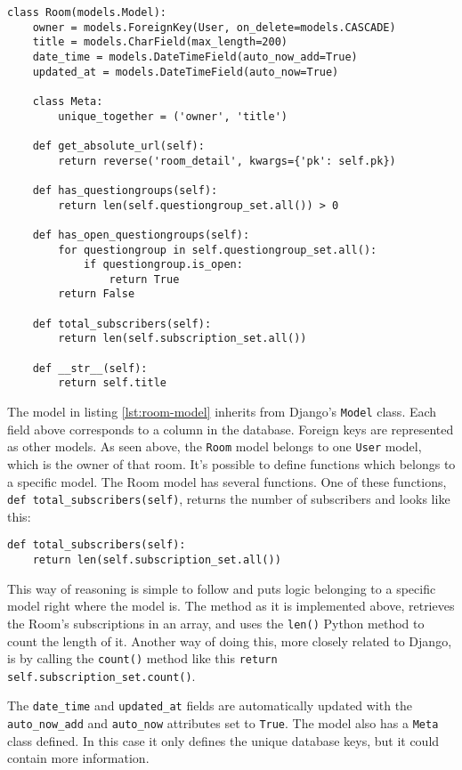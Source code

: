 \begin{lstlisting}[caption=The Room model, label=lst:room-model]
class Room(models.Model):
    owner = models.ForeignKey(User, on_delete=models.CASCADE)
    title = models.CharField(max_length=200)
    date_time = models.DateTimeField(auto_now_add=True)
    updated_at = models.DateTimeField(auto_now=True)

    class Meta:
        unique_together = ('owner', 'title')

    def get_absolute_url(self):
        return reverse('room_detail', kwargs={'pk': self.pk})

    def has_questiongroups(self):
        return len(self.questiongroup_set.all()) > 0

    def has_open_questiongroups(self):
        for questiongroup in self.questiongroup_set.all():
            if questiongroup.is_open:
                return True
        return False

    def total_subscribers(self):
        return len(self.subscription_set.all())

    def __str__(self):
        return self.title
\end{lstlisting}


The model in listing \ref{lst:room-model} inherits from Django's \texttt{Model} class. Each field above corresponds to a column in the database. Foreign keys are represented as other models. As seen above, the \texttt{Room} model belongs to one \texttt{User} model, which is the owner of that room. 
It's possible to define functions which belongs to a specific model. The Room model has several functions. One of these functions, \texttt{def total\_subscribers(self)}, returns the number of subscribers and looks like this:

\begin{lstlisting}[caption=The total subscribers method, label=lst:total-subscribers-method]
def total_subscribers(self):
    return len(self.subscription_set.all())
\end{lstlisting}
This way of reasoning is simple to follow and puts logic belonging to a specific model right where the model is. The method as it is implemented above, retrieves the Room's subscriptions in an array, and uses the \texttt{len()} Python method to count the length of it. Another way of doing this, more closely related to Django, is by calling the \texttt{count()} method like this \texttt{return self.subscription\_set.count()}.

The \texttt{date\_time} and \texttt{updated\_at} fields are automatically updated with the \texttt{auto\_now\_add} and \texttt{auto\_now} attributes set to \texttt{True}. The model also has a \texttt{Meta} class defined. In this case it only defines the unique database keys, but it could contain more information.

